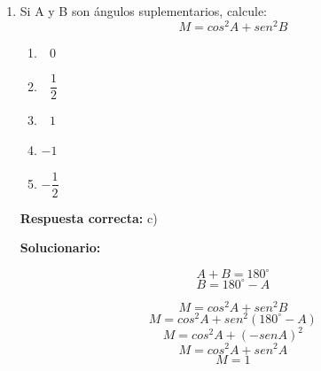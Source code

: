 \begin{enumerate}[resume]
	
	\item Si A y B son ángulos suplementarios, calcule:
	\[M=cos^2A+sen^2B\]
	\begin{enumerate}[label=\alph*)]
		\item $\,\,\,\,0$
		\item $\,\,\,\,\dfrac{1}{2}$
		\item $\,\,\,\,1$
		\item $-1$
		\item $-\dfrac{1}{2}$
	\end{enumerate}
	
	\textbf{Respuesta correcta:} c)
	
	\vspace{2mm}
	\textbf{Solucionario:}
	
	\[A+B=180^\circ\]
	\[B=180^\circ-A\]
	
	\[M=cos^2A+sen^2B\]
	\[M=cos^2A+sen^2(180^\circ-A)\]
	\[M=cos^2A+(-senA)^2\]
	\[M=cos^2A+sen^2A\]
	\[M=1\]
	
\end{enumerate}




